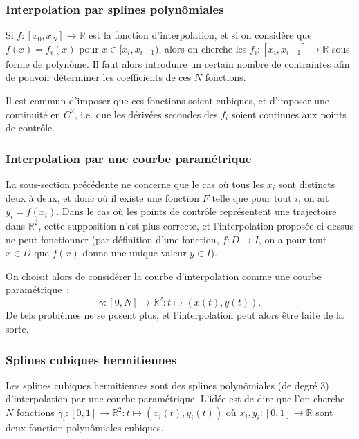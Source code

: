 \documentclass[10pt,journal,compsoc]{IEEEtran}
\newcommand{\R}{\mathbb R}
\begin{document}
    \subsubsection{Interpolation par splines polynômiales}
      Si $f : [x_0, x_N] \to \R$ est la fonction d'interpolation, et si on considère que $f(x) = f_i(x)$ pour $x \in [x_i, x_{i+1})$, %
	  alors on cherche les
	  $f_i : [x_i, x_{i+1}] \to \R$ sous forme de polynôme. Il faut alors introduire un certain nombre de contraintes afin de pouvoir déterminer les coefficients de
	  ces $N$ fonctions.

	  Il est commun d'imposer que ces fonctions soient cubiques, et d'imposer une continuité en $C^2$, i.e. %
	  que les dérivées secondes des $f_i$ soient continues aux
	  points de contrôle.
    \subsubsection{Interpolation par une courbe paramétrique}
	  La sous-section précédente ne concerne que le cas où tous les $x_i$ sont distincts deux à deux, et donc où il existe une fonction $F$ telle que pour tout $i$,
	  on ait $y_i = f(x_i)$. Dans le cas où les points de contrôle représentent une trajectoire dans $\R^2$, cette supposition n'est plus correcte, et l'interpolation
	  proposée ci-dessus ne peut fonctionner (par définition d'une fonction, $f : D \to I$, on a pour tout $x \in D$ que $f(x)$ donne une unique valeur $y \in I$).

	  On choisit alors de considérer la courbe d'interpolation comme une courbe paramétrique~:
	  \begin{equation}
	  	\gamma : [0, N] \to \R^2 : t \mapsto (x(t), y(t)).
      \end{equation}
	  De tels problèmes ne se posent plus, et l'interpolation peut alors être faite de la sorte.
	\subsubsection{Splines cubiques hermitiennes}\label{subsub:splines3herm}
	  Les splines cubiques hermitiennes sont des splines polynômiales (de degré 3) d'interpolation par une courbe paramétrique. L'idée est de dire que l'on cherche
	  $N$ fonctions $\gamma_i : [0, 1] \to \R^2 : t \mapsto (x_i(t), y_i(t))$ où $x_i, y_i : [0, 1] \to \R$ sont deux fonction polynômiales cubiques.
\end{document}
